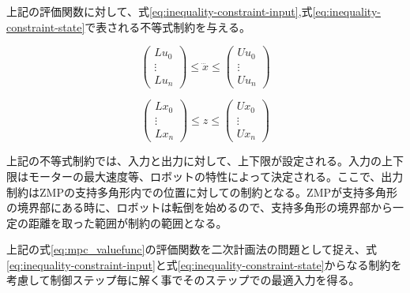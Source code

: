 上記の評価関数に対して、式\eqref{eq:inequality-constraint-input},式\eqref{eq:inequality-constraint-state}で表される不等式制約を与える。

\begin{equation}
  \begin{pmatrix}
    Lu_{0} \\ \vdots \\ Lu_{n}
  \end{pmatrix}
  \leq \dddot{x} \leq
  \begin{pmatrix}
    Uu_{0} \\ \vdots \\ Uu_{n}
  \end{pmatrix}
  \label{eq:inequality-constraint-input}
\end{equation}

\begin{equation}
  \begin{pmatrix}
    Lx_{0} \\ \vdots \\ Lx_{n}
  \end{pmatrix}
  \leq z \leq
  \begin{pmatrix}
    Ux_{0} \\ \vdots \\ Ux_{n}
  \end{pmatrix}
  \label{eq:inequality-constraint-state}
\end{equation}


上記の不等式制約では、入力と出力に対して、上下限が設定される。入力の上下限はモーターの最大速度等、ロボットの特性によって決定される。ここで、出力制約はZMPの支持多角形内での位置に対しての制約となる。ZMPが支持多角形の境界部にある時に、ロボットは転倒を始めるので、支持多角形の境界部から一定の距離を取った範囲が制約の範囲となる。

上記の式\eqref{eq:mpc_valuefunc}の評価関数を二次計画法の問題として捉え、式\eqref{eq:inequality-constraint-input}と式\eqref{eq:inequality-constraint-state}からなる制約を考慮して制御ステップ毎に解く事でそのステップでの最適入力を得る。